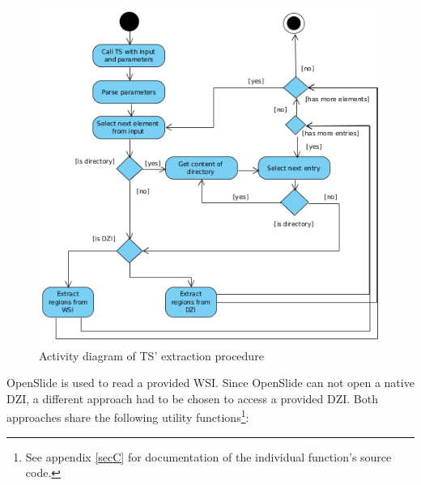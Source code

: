 \begin{figure}[H]
	\begin{center}
		\includegraphics[scale=0.65]{img/ts_run.png}
		\caption{Activity diagram of TS' extraction procedure}
		\label{fig5_tsRunUml}
	\end{center}
\end{figure}

OpenSlide is used to read a provided WSI. Since OpenSlide can not open a native DZI, a different approach had to be chosen to access a provided DZI. Both approaches share the following utility functions\footnote{
	See appendix \ref{secC} for documentation of the individual function's source code.
}:

